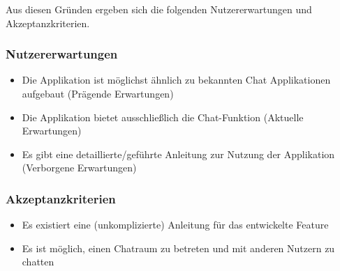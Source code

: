 \noindent{}Aus diesen Gründen ergeben sich die folgenden Nutzererwartungen und Akzeptanzkriterien.

\subsubsection{Nutzererwartungen}
\begin{itemize}
  \item Die Applikation ist möglichst ähnlich zu bekannten Chat Applikationen aufgebaut (Prägende Erwartungen)
  \item Die Applikation bietet ausschließlich die Chat-Funktion (Aktuelle Erwartungen)
  \item Es gibt eine detaillierte/geführte Anleitung zur Nutzung der Applikation (Verborgene Erwartungen)
\end{itemize}

\subsubsection{Akzeptanzkriterien}
\begin{itemize}
  \item Es existiert eine (unkomplizierte) Anleitung für das entwickelte Feature
  \item Es ist möglich, einen Chatraum zu betreten und mit anderen Nutzern zu chatten
\end{itemize}

